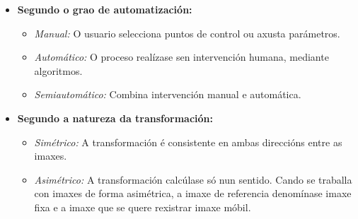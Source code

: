 \begin{itemize}
    \item \textbf{Segundo o grao de automatización:} \cite{deeplernreview3dreg}
    \begin{itemize}
        \item \textit{Manual:} O usuario selecciona puntos de control ou axusta parámetros.
        \item \textit{Automático:} O proceso realízase sen intervención humana, mediante algoritmos.
        \item \textit{Semiautomático:} Combina intervención manual e automática.
    \end{itemize}

    \item \textbf{Segundo a natureza da transformación:}
    \begin{itemize}
        \item \textit{Simétrico:} A transformación é consistente en ambas direccións entre as imaxes.
        \item \textit{Asimétrico:} A transformación calcúlase só nun sentido. Cando se traballa con imaxes de forma asimétrica, a imaxe de referencia denomínase imaxe fixa e a imaxe que se quere rexistrar imaxe móbil.
    \end{itemize}

\end{itemize}

